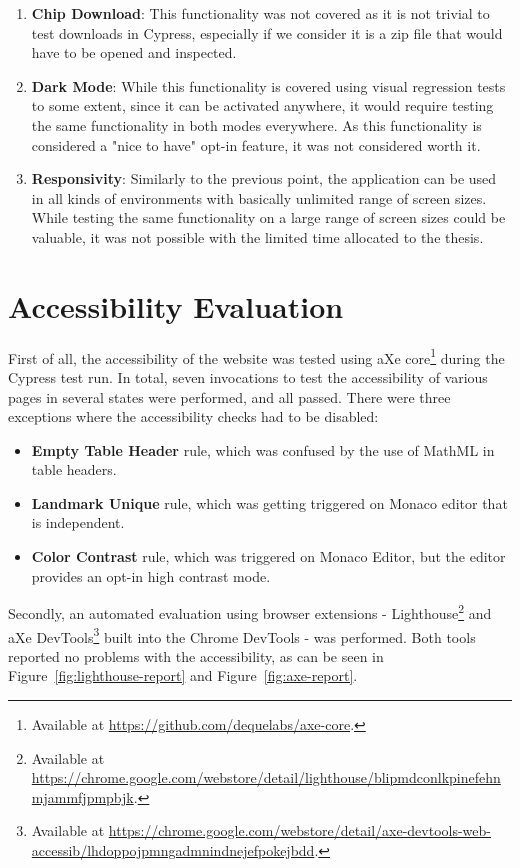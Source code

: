 \begin{enumerate}
    \item \textbf{Chip Download}: This functionality was not covered as it is not trivial to test downloads in Cypress, especially if we consider it is a zip file that would have to be opened and inspected.
    \item \textbf{Dark Mode}: While this functionality is covered using visual regression tests to some extent, since it can be activated anywhere, it would require testing the same functionality in both modes everywhere. As this functionality is considered a "nice to have" opt-in feature, it was not considered worth it.
    \item \textbf{Responsivity}: Similarly to the previous point, the application can be used in all kinds of environments with basically unlimited range of screen sizes. While testing the same functionality on a large range of screen sizes could be valuable, it was not possible with the limited time allocated to the thesis.
\end{enumerate}

\section{Accessibility Evaluation}
\label{Evaluation-Accessibility}

First of all, the accessibility of the website was tested using aXe core\footnote{Available at \url{https://github.com/dequelabs/axe-core}.} during the Cypress test run.
In total, seven invocations to test the accessibility of various pages in several states were performed, and all passed.
There were three exceptions where the accessibility checks had to be disabled:

\begin{itemize}
    \item \textbf{Empty Table Header} rule, which was confused by the use of MathML in table headers.
    \item \textbf{Landmark Unique} rule, which was getting triggered on Monaco editor that is independent.
    \item \textbf{Color Contrast} rule, which was triggered on Monaco Editor, but the editor provides an opt-in high contrast mode.
\end{itemize}

Secondly, an automated evaluation using browser extensions - Lighthouse\footnote{Available at \url{https://chrome.google.com/webstore/detail/lighthouse/blipmdconlkpinefehnmjammfjpmpbjk}.} and aXe DevTools\footnote{Available at \url{https://chrome.google.com/webstore/detail/axe-devtools-web-accessib/lhdoppojpmngadmnindnejefpokejbdd}.} built into the Chrome DevTools - was performed.
Both tools reported no problems with the accessibility, as can be seen in Figure~\ref{fig:lighthouse-report} and Figure~\ref{fig:axe-report}.

